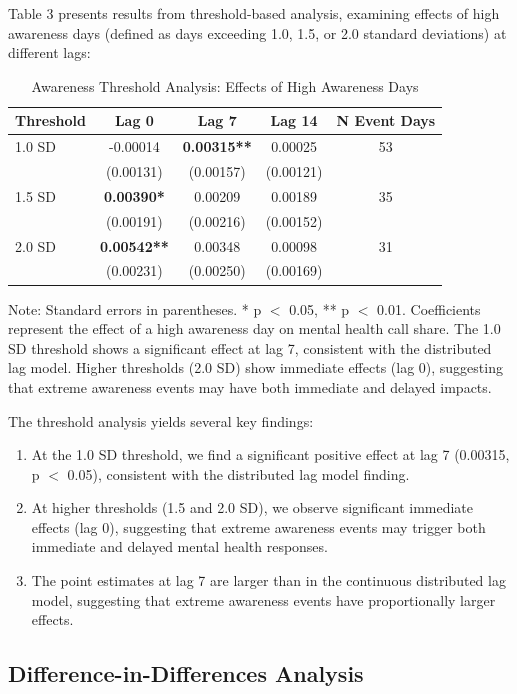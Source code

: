 \documentclass[11pt,a4paper]{article}
\begin{document}
Table 3 presents results from threshold-based analysis, examining effects of high awareness days (defined as days exceeding 1.0, 1.5, or 2.0 standard deviations) at different lags:

\begin{table}[H]
\centering
\caption{Awareness Threshold Analysis: Effects of High Awareness Days}
\label{tab:threshold}
\begin{tabular}{lcccc}
\toprule
Threshold & Lag 0 & Lag 7 & Lag 14 & N Event Days \\
\midrule
1.0 SD & -0.00014 & \textbf{0.00315**} & 0.00025 & 53 \\
 & (0.00131) & (0.00157) & (0.00121) & \\
\midrule
1.5 SD & \textbf{0.00390*} & 0.00209 & 0.00189 & 35 \\
 & (0.00191) & (0.00216) & (0.00152) & \\
\midrule
2.0 SD & \textbf{0.00542**} & 0.00348 & 0.00098 & 31 \\
 & (0.00231) & (0.00250) & (0.00169) & \\
\bottomrule
\end{tabular}
\footnotesize
Note: Standard errors in parentheses. * p $<$ 0.05, ** p $<$ 0.01. Coefficients represent the effect of a high awareness day on mental health call share. The 1.0 SD threshold shows a significant effect at lag 7, consistent with the distributed lag model. Higher thresholds (2.0 SD) show immediate effects (lag 0), suggesting that extreme awareness events may have both immediate and delayed impacts.
\end{table}

The threshold analysis yields several key findings:

\begin{enumerate}
    \item At the 1.0 SD threshold, we find a significant positive effect at lag 7 (0.00315, p $<$ 0.05), consistent with the distributed lag model finding.
    \item At higher thresholds (1.5 and 2.0 SD), we observe significant immediate effects (lag 0), suggesting that extreme awareness events may trigger both immediate and delayed mental health responses.
    \item The point estimates at lag 7 are larger than in the continuous distributed lag model, suggesting that extreme awareness events have proportionally larger effects.
\end{enumerate}

\subsection{Difference-in-Differences Analysis}
\end{document}
